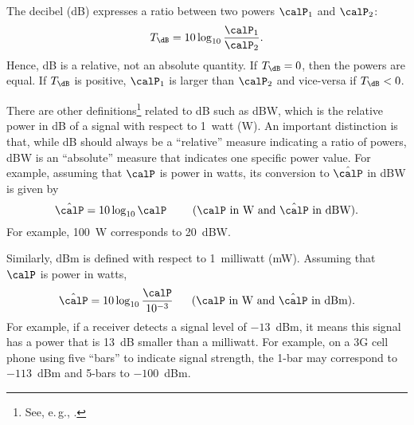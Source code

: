 The decibel (dB) expresses a ratio between two powers $\calP_1$ and $\calP_2$:
\begin{equation}
T_\dB = 10 \log_{10} \frac{\calP_1}{\calP_2}.
\label{eq:decibelDefinition}
\end{equation}
Hence, dB is a relative, not an absolute quantity. If $T_\dB=0$, then the powers are equal. If $T_\dB$ is positive, $\calP_1$ is larger than $\calP_2$ and vice-versa if $T_\dB<0$.

There are other definitions\footnote{See, e.\,g., .} related to dB such as dBW, which is the relative power in dB of a signal with respect to 1~watt (W). An important distinction is that, while dB should always be a ``relative'' measure indicating a ratio of powers, dBW is an ``absolute'' measure that indicates one specific power value. For example, assuming that $\calP$ is power in watts, its conversion to $\hat \calP$ in dBW is given by
\[
	 \hat \calP = 10 \log_{10} \calP\textrm{~~~~~~~($\calP$ in W and $\hat \calP$ in dBW)}.
\]
For example, 100~W corresponds to 20~dBW.

Similarly, dBm is defined with respect to 1~milliwatt (mW). Assuming that $\calP$ is power in watts,
\[
	 \hat \calP = 10 \log_{10} \frac{\calP}{10^{-3}}\textrm{~~~~~($\calP$ in W and $\hat \calP$ in dBm)}.
\]
For example, if a receiver detects a signal level of $-13$~dBm, it means this signal has a power that is 13~dB smaller than a milliwatt. %
For example, on a 3G cell phone using five ``bars'' to indicate signal strength, the 1-bar may correspond to $-113$~dBm and 5-bars to $-100$~dBm.



